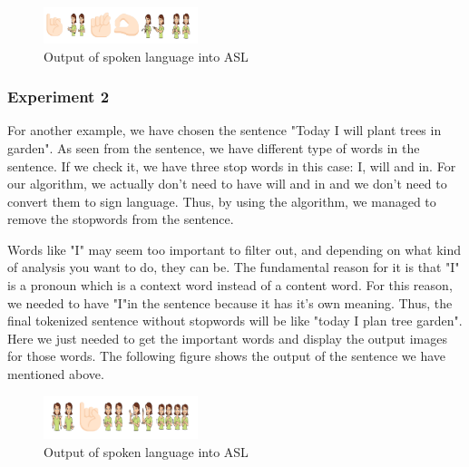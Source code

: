 \documentclass[twocolumn,10pt]{asme2ej}
\begin{document}
\begin{figure}[h]
    \centering
    \includegraphics[width=0.4\textwidth]{figure/Untitled.png}
    \caption{Output of spoken language into ASL}
    \label{fig:mesh1}
\end{figure}

\subsubsection{Experiment 2}

For another example, we have chosen the sentence "Today I will plant trees in garden". As seen from the sentence, we have different type of words in the sentence. If we check it, we have three stop words in this case: I, will and in. For our algorithm, we actually don't need to have will and in and we don't need to convert them to sign language. Thus, by using the algorithm, we managed to remove the stopwords from the sentence. 


Words like "I" may seem too important to filter out, and depending on what kind of analysis you want to do, they can be. The fundamental reason for it is that "I" is a pronoun which is a context word instead of a content word. For this reason, we needed to have "I"in the sentence because it has it's own meaning. Thus, the final tokenized sentence without stopwords will be like "today I plan tree garden". Here we just needed to get the important words and display the output images for those words. The following figure shows the output of the sentence we have mentioned above. 

\begin{figure}[h]
    \centering
    \includegraphics[width=0.4\textwidth]{figure/New Project.png}
    \caption{Output of spoken language into ASL}
    \label{fig:mesh1}
\end{figure}
\end{document}
